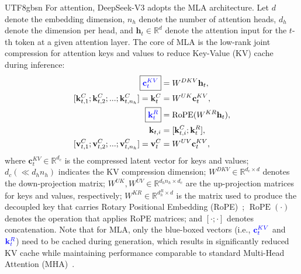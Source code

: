 \documentclass[11pt, a4paper, logo, copyright, nonumbering]{deepseek}
\newcommand{\dsattn}{MLA}
\newcommand{\dsviii}{DeepSeek-V3}
\begin{document}
\begin{CJK*}{UTF8}{gbsn}
For attention, \dsviii{} adopts the \dsattn{} architecture. 
Let $d$ denote the embedding dimension, $n_h$ denote the number of attention heads, $d_h$ denote the dimension per head, and $\mathbf{h}_{t} \in \mathbb{R}^{d}$ denote the attention input for the $t$-th token at a given attention layer.
The core of \dsattn{} is the low-rank joint compression for attention keys and values to reduce Key-Value (KV) cache during inference:
\begin{align}
    \boxed{\color{blue} \mathbf{c}_{t}^{KV}} &= W^{DKV} \mathbf{h}_{t}, \\
    [\mathbf{k}_{t, 1}^{C};\mathbf{k}_{t, 2}^{C};...;\mathbf{k}_{t, n_{h}}^{C}] = \mathbf{k}_{t}^{C} &= W^{UK} \mathbf{c}_{t}^{KV}, \\
    \boxed{\color{blue}\mathbf{k}_{t}^{R}} &= \operatorname{RoPE}({W^{KR}} \mathbf{h}_{t}), \\
    \mathbf{k}_{t, i} &= [\mathbf{k}_{t, i}^{C}; \mathbf{k}_{t}^{R}], \\
    [\mathbf{v}_{t, 1}^{C};\mathbf{v}_{t, 2}^{C};...;\mathbf{v}_{t, n_{h}}^{C}] = \mathbf{v}_{t}^{C} &= W^{UV} \mathbf{c}_{t}^{KV}, 
\end{align}
where $\mathbf{c}_{t}^{KV} \in \mathbb{R}^{d_c}$ is the compressed latent vector for keys and values; 
$d_c (\ll d_h n_h)$ indicates the KV compression dimension;
$W^{DKV} \in \mathbb{R}^{d_c \times d}$ denotes the down-projection matrix;
$W^{UK},W^{UV} \in \mathbb{R}^{d_h n_h \times d_c}$ are the up-projection matrices for keys and values, respectively;
$W^{KR} \in \mathbb{R}^{d_h^R \times d}$ is the matrix used to produce the decoupled key that carries Rotary Positional Embedding (RoPE)~\citep{su2024roformer}; 
$\operatorname{RoPE}(\cdot)$ denotes the operation that applies RoPE matrices; 
and $[\cdot;\cdot]$ denotes concatenation.
Note that for MLA, only the blue-boxed vectors (i.e., $\color{blue} \mathbf{c}_{t}^{KV}$ and $\color{blue}\mathbf{k}_{t}^{R}$) need to be cached during generation, which results in significantly reduced KV cache while maintaining performance comparable to standard Multi-Head Attention (MHA)~\citep{transformer}.


\end{CJK*}
\end{document}

